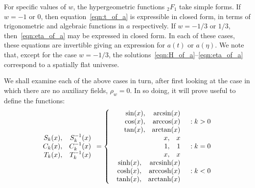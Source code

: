 For specific values of \(w\), the hypergeometric functions \(_2F_1\) take simple forms. If \(w=-1\) or \(0\), then equation~\eqref{eqn:t_of_a} is expressible in closed form, in terms of trigonometric and algebraic functions in \(a\) respectively. If \(w=-1/3\) or \(1/3\), then~\eqref{eqn:eta_of_a} may be expressed in closed form. In each of these cases, these equations are invertible giving an expression for \(a(t)\) or \(a(\eta)\).  We note that, except for the case \(w=-1/3\), the solutions~\eqref{eqn:H_of_a}--\eqref{eqn:eta_of_a} correspond to a spatially flat universe.

We shall examine each of the above cases in turn, after first looking at the case in which there are no auxiliary fields, \(\rho_w=0\).  In so doing, it will prove useful to define the functions:
%
\begin{equation}
  \begin{array}{rr}
    S_k(x),&S_k^{-1}(x)
    \\ 
    C_k(x),&C_k^{-1}(x)
    \\ 
    T_k(x),&T_k^{-1}(x)
    \\
  \end{array}
  =
  \left\{
%
  \begin{array}{rl}
%
    \begin{array}{rr}
      \sin(x),&\arcsin(x)
      \\ 
      \cos(x),&\arccos(x)
      \\ 
      \tan(x),&\arctan(x)
      \\
    \end{array}
%
    &: k>0 \\
%
    \begin{array}{rr}
      x,&x
      \\ 
      1,&1
      \\ 
      x,&x
      \\
    \end{array}
%
    &: k=0 \\
%
    \begin{array}{rr}
      \sinh(x),&\arcsinh(x)
      \\ 
      \cosh(x),&\arccosh(x)
      \\ 
      \tanh(x),&\arctanh(x)
      \\
    \end{array}
%
    &: k<0
  \end{array}
%
  \right. 
\end{equation}
%

